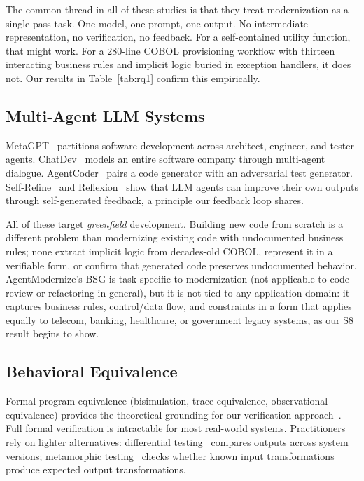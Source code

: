 \documentclass[conference]{IEEEtran}
\begin{document}
The common thread in all of these studies is that they treat modernization as a single-pass task. One model, one prompt, one output. No intermediate representation, no verification, no feedback. For a self-contained utility function, that might work. For a 280-line COBOL provisioning workflow with thirteen interacting business rules and implicit logic buried in exception handlers, it does not. Our results in Table~\ref{tab:rq1} confirm this empirically.

\subsection{Multi-Agent LLM Systems}

MetaGPT~\cite{hong2024metagpt} partitions software development across architect, engineer, and tester agents. ChatDev~\cite{qian2024chatdev} models an entire software company through multi-agent dialogue. AgentCoder~\cite{huang2023agentcoder} pairs a code generator with an adversarial test generator. Self-Refine~\cite{madaan2023selfrefine} and Reflexion~\cite{shinn2023reflexion} show that LLM agents can improve their own outputs through self-generated feedback, a principle our feedback loop shares.

All of these target \textit{greenfield} development. Building new code from scratch is a different problem than modernizing existing code with undocumented business rules; none extract implicit logic from decades-old COBOL, represent it in a verifiable form, or confirm that generated code preserves undocumented behavior. AgentModernize's BSG is task-specific to modernization (not applicable to code review or refactoring in general), but it is not tied to any application domain: it captures business rules, control/data flow, and constraints in a form that applies equally to telecom, banking, healthcare, or government legacy systems, as our S8 result begins to show.

\subsection{Behavioral Equivalence}

Formal program equivalence (bisimulation, trace equivalence, observational equivalence) provides the theoretical grounding for our verification approach~\cite{milner1989communication}. Full formal verification is intractable for most real-world systems. Practitioners rely on lighter alternatives: differential testing~\cite{mckeeman1998differential} compares outputs across system versions; metamorphic testing~\cite{chen1998metamorphic} checks whether known input transformations produce expected output transformations.
\end{document}
